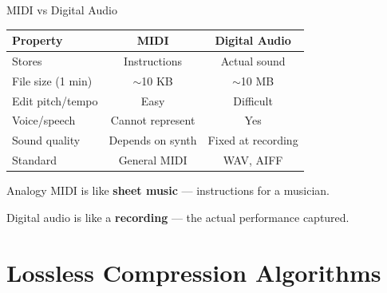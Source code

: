 \documentclass[aspectratio=169,12pt]{beamer}
\begin{document}
\begin{frame}{MIDI vs Digital Audio}
    \begin{center}
        \begin{tabular}{l|c|c}
            \toprule
            \textbf{Property} & \textbf{MIDI} & \textbf{Digital Audio} \\
            \midrule
            Stores & Instructions & Actual sound \\
            File size (1 min) & $\sim$10 KB & $\sim$10 MB \\
            Edit pitch/tempo & Easy & Difficult \\
            Voice/speech & Cannot represent & Yes \\
            Sound quality & Depends on synth & Fixed at recording \\
            Standard & General MIDI & WAV, AIFF \\
            \bottomrule
        \end{tabular}
    \end{center}
    
    \vspace{0.3cm}
    \begin{block}{Analogy}
        MIDI is like \textbf{sheet music} --- instructions for a musician.
        
        Digital audio is like a \textbf{recording} --- the actual performance captured.
    \end{block}
\end{frame}


\section{Lossless Compression Algorithms}
\end{document}
